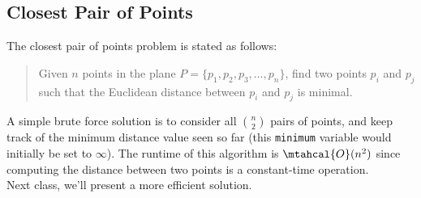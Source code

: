 \subsection{Closest Pair of Points}

The closest pair of points problem is stated as follows:

\begin{quote}
    Given $n$ points in the plane $P = \{p_1, p_2, p_3, \ldots, p_n\}$, find two points $p_i$ and $p_j$ such that the Euclidean distance between $p_i$ and $p_j$ is minimal. 
\end{quote}

A simple brute force solution is to consider all ${n\choose 2}$ pairs of points, and keep track of the minimum distance value seen so far (this \verb!minimum! variable would initially be set to $\infty$). The runtime of this algorithm is $\mtahcal{O}(n^2)$ since computing the distance between two points is a constant-time operation. \\

Next class, we'll present a more efficient solution. 